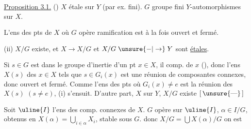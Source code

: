 \uline{Proposition 3.1.} () $X$ étale sur $Y$ (par ex. fini).
$G$ groupe fini   $Y$-automorphismes sur $X$.

  L'ens des pts de $X$ où $G$ opère
 ramification est à la fois ouvert et fermé.

(ii)  $X/G$ existe, et $X\to X/G$
et $X/G\mathrel{\unsure{-|\to}}Y$ sont \uline{étales}.

Si $s\in G$  est dans le groupe
d'inertie d'un pt $x\in X$, il   
comp.   de $x$ (), donc l'ens $X(s)$
des $x\in X$ tels que $s\in G_{i}(x)$ est une
réunion de composantes connexes, donc ouvert et
fermé. Comme  l'ens des pts où
$G_i(x)\ne e$ est la réunion des $X(s)$ $(s\ne e)$,
(i) s'ensuit. D'autre part, $X$ 
 sur $Y$, $X/G$ existe $[\,\unsure{\text{---}}\,]$
   

Soit $\uline{I}$ l'ens des comp. connexes de $X$.
$G$ opère sur $\uline{I}$,  
  $\alpha\in I/G$, obtenus en
 $X(\alpha)=\bigcup_{i\in\alpha}X_{i}$, stable sous $G$.
donc $X/G=\bigcup X(\alpha)/G$ on est
